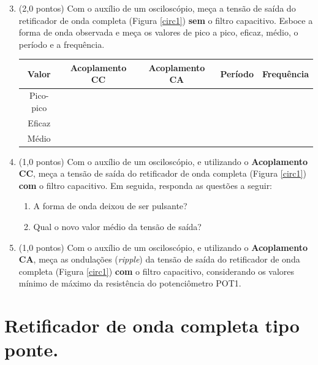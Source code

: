 \documentclass[11pt]{article}
\begin{document}
\begin{enumerate}
\setcounter{enumi}{2}
\item (2,0 pontos) Com o auxílio de um osciloscópio, meça a tensão de saída do retificador de onda completa (Figura \ref{circ1}) \textbf{sem} o filtro capacitivo. Esboce a forma de onda observada e meça os valores de pico a pico, eficaz, médio, o período e a frequência.

\begin{figure}[!h]
	\centering
\end{figure}

\begin{table}[!h]
\centering
\begin{tabular}{|c|c|c|c|c|}
\hline
Valor & Acoplamento CC & Acoplamento CA & Período & Frequência\\\hline
Pico-pico & & & & \\\cline{1-3}
Eficaz & & & & \\\cline{1-3}
Médio & & & & \\\hline
\end{tabular}
\end{table}

\item (1,0 pontos) Com o auxílio de um osciloscópio, e utilizando o \textbf{Acoplamento CC}, meça a tensão de saída do retificador de onda completa (Figura \ref{circ1}) \textbf{com} o filtro capacitivo. Em seguida, responda as questões a seguir:

\begin{enumerate}
\item A forma de onda deixou de ser pulsante?
\item Qual o novo valor médio da tensão de saída?
\end{enumerate}

\item (1,0 pontos) Com o auxílio de um osciloscópio, e utilizando o \textbf{Acoplamento CA}, meça as ondulações (\textit{ripple}) da tensão de saída do retificador de onda completa (Figura \ref{circ1}) \textbf{com} o filtro capacitivo, considerando os valores mínimo de máximo da resistência do potenciômetro POT1.
\end{enumerate}

\section*{Retificador de onda completa tipo ponte.}
\end{document}

